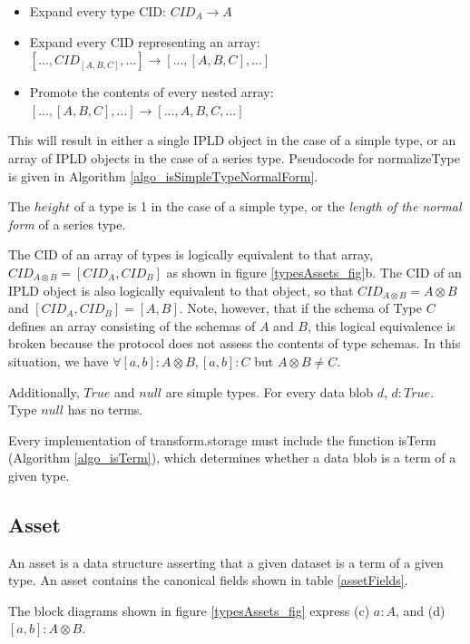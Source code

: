 \documentclass[9pt, oneside]{article}   	%
\begin{document}
\begin{itemize}
\item Expand every type CID: $CID_A \rightarrow A$
\item Expand every CID representing an array: $[..., CID_{[A,B,C]}, ...] \rightarrow [..., [A,B,C], ...]$
\item Promote the contents of every nested array: $ [..., [A,B,C], ...] \rightarrow [..., A,B,C, ...]$
\end{itemize}

This will result in either a single IPLD object in the case of a simple type, or an array of IPLD objects in the case of a series type. Pseudocode for normalizeType is given in Algorithm \ref{algo_isSimpleTypeNormalForm}.

The $height$ of a type is 1 in the case of a simple type, or the \textit{length of the normal form} of a series type.

The CID of an array of types is logically equivalent to that array, $CID_{A \otimes B} = [CID_A, CID_B]$ as shown in figure \ref{typesAssets_fig}b. The CID of an IPLD object is also logically equivalent to that object, so that $CID_{A \otimes B} = A \otimes B$ and $[CID_A, CID_B] = [A,B]$. Note, however, that  if the schema of Type $C$ defines an array consisting of the schemas of $A$ and $B$, this logical equivalence is broken because the protocol does not assess the contents of type schemas. In this situation, we have $\forall [a,b] : A\otimes B,  [a,b] : C$ but $ A\otimes B \neq C$.

Additionally, $True$ and $null$ are simple types. For every data blob $d$, $d : True$. Type $null$ has no terms.

Every implementation of transform.storage must include the function isTerm (Algorithm \ref{algo_isTerm}), which determines whether a data blob is a term of a given type.

\subsection{Asset}\label{asset}

An asset is a data structure asserting that a given dataset is a term of a given type. An asset contains the canonical fields shown in table \ref{assetFields}.

The block diagrams shown in figure \ref{typesAssets_fig} express (c) $a : A$, and (d) $[a, b] : A \otimes B$. 
\end{document}
